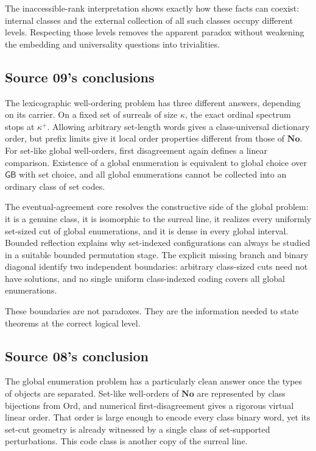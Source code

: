\documentclass[11pt]{article}
\theoremstyle{definition}
\theoremstyle{remark}
\newcommand{\No}{\mathbf{No}}
\newcommand{\Ord}{\mathrm{Ord}}
\newcommand{\GB}{\mathsf{GB}}
\begin{document}
The inaccessible-rank interpretation shows exactly how these facts can
coexist: internal classes and the external collection of all such
classes occupy different levels. Respecting those levels removes the
apparent paradox without weakening the embedding and universality
questions into trivialities.

\subsection{Source 09's conclusions}
The lexicographic well-ordering problem has three different answers,
depending on its carrier. On a fixed set of surreals of size $\kappa$,
the exact ordinal spectrum stops at $\kappa^+$. Allowing arbitrary
set-length words gives a class-universal dictionary order, but prefix
limits give it local order properties different from those of $\No$.
For set-like global well-orders, first disagreement again defines a
linear comparison. Existence of a global enumeration is equivalent to
global choice over $\GB$ with set choice, and all global enumerations
cannot be collected into an ordinary class of set codes.

The eventual-agreement core resolves the constructive side of the
global problem: it is a genuine class, it is isomorphic to the surreal
line, it realizes every uniformly set-sized cut of global enumerations,
and it is dense in every global interval. Bounded reflection explains
why set-indexed configurations can always be studied in a suitable
bounded permutation stage. The explicit missing branch and binary
diagonal identify two independent boundaries: arbitrary class-sized
cuts need not have solutions, and no single uniform class-indexed
coding covers all global enumerations.

These boundaries are not paradoxes. They are the information needed to
state theorems at the correct logical level.

\subsection{Source 08's conclusion}

The global enumeration problem has a particularly clean answer once
the types of objects are separated. Set-like well-orders of $\No$ are
represented by class bijections from $\Ord$, and numerical
first-disagreement gives a rigorous virtual linear order. That order
is large enough to encode every class binary word, yet its set-cut
geometry is already witnessed by a single class of set-supported
perturbations. This code class is another copy of the surreal line.
\end{document}
